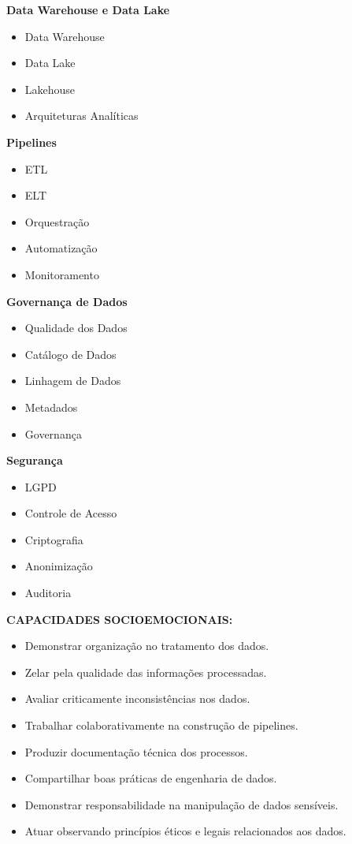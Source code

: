 \textbf{Data Warehouse e Data Lake}

\begin{itemize}
\item Data Warehouse
\item Data Lake
\item Lakehouse
\item Arquiteturas Analíticas
\end{itemize}

\textbf{Pipelines}

\begin{itemize}
\item ETL
\item ELT
\item Orquestração
\item Automatização
\item Monitoramento
\end{itemize}

\textbf{Governança de Dados}

\begin{itemize}
\item Qualidade dos Dados
\item Catálogo de Dados
\item Linhagem de Dados
\item Metadados
\item Governança
\end{itemize}

\textbf{Segurança}

\begin{itemize}
\item LGPD
\item Controle de Acesso
\item Criptografia
\item Anonimização
\item Auditoria
\end{itemize}

\textbf{CAPACIDADES SOCIOEMOCIONAIS:}

\begin{itemize}
\item Demonstrar organização no tratamento dos dados.
\item Zelar pela qualidade das informações processadas.
\item Avaliar criticamente inconsistências nos dados.
\item Trabalhar colaborativamente na construção de pipelines.
\item Produzir documentação técnica dos processos.
\item Compartilhar boas práticas de engenharia de dados.
\item Demonstrar responsabilidade na manipulação de dados sensíveis.
\item Atuar observando princípios éticos e legais relacionados aos dados.
\end{itemize}

